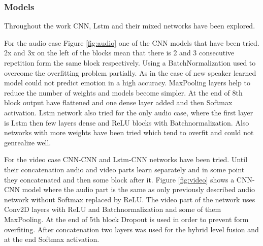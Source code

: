 \documentclass[oneside]{report}
\begin{document}
    \subsubsection{Models}
    Throughout the work CNN, Lstm and their mixed networks have been explored. 
    
    For the audio case Figure \ref{fig:audio} one of the CNN models that have been tried. 2x and 3x on the left of the blocks mean that there is 2 and 3 consecutive repetition form the same block respectively. Using a BatchNormalization used to overcome the overfitting problem partially. As in the case of new speaker learned model could not predict emotion in a high accuracy. MaxPooling layers help to reduce the number of weights and models become simpler. At the end of 8th block output have flattened and one dense layer added and then Softmax activation. Lstm network also tried for the only audio case, where the first layer is Lstm then few layers dense and ReLU blocks with Batchnormalization. Also networks with more weights have been tried which tend to overfit and could not genrealize well. 
    
    For the video case CNN-CNN and Lstm-CNN networks have been tried. Until their concatenation audio and video parts learn separately and in some point they concatenated and then some block after it. Figure \ref{fig:video} shows a CNN-CNN model where the audio part is the same as only previously described audio network without Softmax replaced by ReLU. The video part of the network uses Conv2D layers with ReLU and Batchnormalization and some of them MaxPooling. At the end of 5th block Dropout is used in order to prevent form overfiting. After concatenation two layers was used for the hybrid level fusion and at the end Softmax activation. 
        
\end{document}
